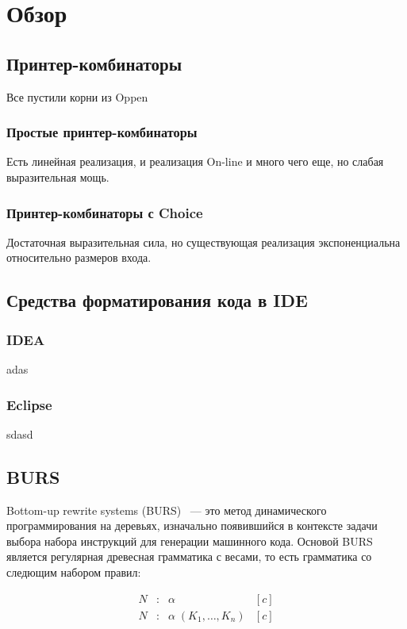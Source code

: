 \section{Обзор}

\subsection{Принтер-комбинаторы}
Все пустили корни из Oppen

\subsubsection{Простые принтер-комбинаторы}
Есть линейная реализация, и реализация On-line и много чего еще, но слабая выразительная мощь.

\subsubsection{Принтер-комбинаторы с Choice}
Достаточная выразительная сила, но существующая реализация экспоненциальна
относительно размеров входа.

\subsection{Средства форматирования кода в IDE}

\subsubsection{IDEA}
adas
\subsubsection{Eclipse}
sdasd

\subsection{BURS}
Bottom-up rewrite systems (BURS)~\cite{burs} --- это метод динамического
программирования на деревьях, изначально появившийся в контексте задачи выбора
набора инструкций для генерации машинного кода. Основой BURS является
регулярная древесная грамматика с весами, то есть грамматика со следющим
набором правил: 

$$
\begin{array}{rcll}
  N &:& \alpha& [c]\\
  N &:& \alpha\; (K_1,\dots,K_n)& [c]
\end{array}
$$

